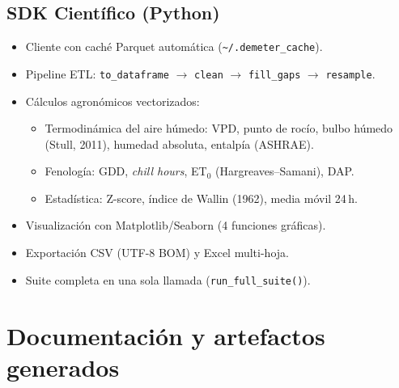 \subsection{SDK Cient\'ifico (Python)}
\begin{itemize}[leftmargin=*]
    \item Cliente con cach\'e Parquet autom\'atica
    (\texttt{\textasciitilde/.demeter\_cache}).
    \item Pipeline ETL: \texttt{to\_dataframe} $\to$ \texttt{clean}
    $\to$ \texttt{fill\_gaps} $\to$ \texttt{resample}.
    \item C\'alculos agron\'omicos vectorizados:
    \begin{itemize}
        \item Termodin\'amica del aire h\'umedo: VPD, punto de roc\'io,
        bulbo h\'umedo (Stull, 2011), humedad absoluta, entalp\'ia (ASHRAE).
        \item Fenolog\'ia: GDD, \textit{chill hours},
        ET$_0$ (Hargreaves--Samani), DAP.
        \item Estad\'istica: Z-score, \'indice de Wallin (1962), media m\'ovil 24\,h.
    \end{itemize}
    \item Visualizaci\'on con Matplotlib/Seaborn (4 funciones gr\'aficas).
    \item Exportaci\'on CSV (UTF-8 BOM) y Excel multi-hoja.
    \item Suite completa en una sola llamada (\texttt{run\_full\_suite()}).
\end{itemize}

\section{Documentaci\'on y artefactos generados}

